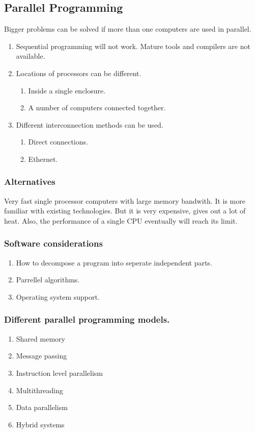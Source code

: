 \documentclass[11pt]{article}
\begin{document}
\subsection{Parallel Programming}
\label{sec:org835798f}
Bigger problems can be solved if more than one computers are used in parallel.
\begin{enumerate}
\item Sequential programming will not work. Mature tools and compilers are not available.
\item Locations of processors can be different.
\begin{enumerate}
\item Inside a single enclosure.
\item A number of computers connected together.
\end{enumerate}
\item Different interconnection methods can be used.
\begin{enumerate}
\item Direct connections.
\item Ethernet.
\end{enumerate}
\end{enumerate}
\subsubsection{Alternatives}
\label{sec:orgfbe957b}
Very fast single processor computers with large memory bandwith. It is more familiar with existing technologies.
But it is very expensive, gives out a lot of
 heat. Also, the performance of a single CPU eventually will reach its limit.
\subsubsection{Software considerations}
\label{sec:org9e8ef46}
\begin{enumerate}
\item How to decompose a program into seperate independent parts.
\item Parrellel algorithms.
\item Operating system support.
\end{enumerate}
\subsubsection{Different parallel programming models.}
\label{sec:orgb3e65f3}
\begin{enumerate}
\item Shared memory
\item Message passing
\item Instruction level parallelism
\item Multithreading
\item Data parallelism
\item Hybrid systems
\end{enumerate}
\end{document}

